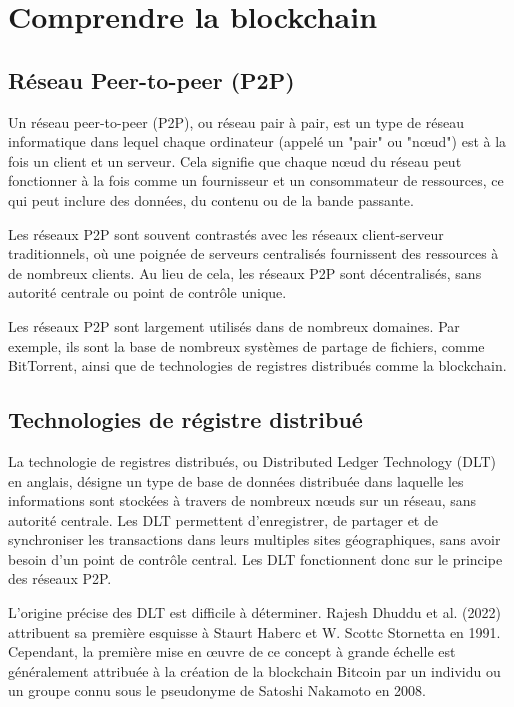 \chapter{Comprendre la blockchain} \label{annexe:comprendre la blockchain}
\section{Réseau Peer-to-peer (P2P)} \label{ansec:p2p}


Un réseau peer-to-peer (P2P), ou réseau pair à pair, est un type de réseau informatique dans lequel chaque ordinateur (appelé un "pair" ou "nœud") est à la fois un client et un serveur. Cela signifie que chaque nœud du réseau peut fonctionner à la fois comme un fournisseur et un consommateur de ressources, ce qui peut inclure des données, du contenu ou de la bande passante.

Les réseaux P2P sont souvent contrastés avec les réseaux client-serveur traditionnels, où une poignée de serveurs centralisés fournissent des ressources à de nombreux clients. Au lieu de cela, les réseaux P2P sont décentralisés, sans autorité centrale ou point de contrôle unique.

Les réseaux P2P sont largement utilisés dans de nombreux domaines. Par exemple, ils sont la base de nombreux systèmes de partage de fichiers, comme BitTorrent, ainsi que de technologies de registres distribués comme la blockchain.


\section{Technologies de régistre distribué} \label{ansec:dlt}


La technologie de registres distribués, ou Distributed Ledger Technology (DLT) en anglais, désigne un type de base de données distribuée dans laquelle les informations sont stockées à travers de nombreux nœuds sur un réseau, sans autorité centrale. Les DLT permettent d'enregistrer, de partager et de synchroniser les transactions dans leurs multiples sites géographiques, sans avoir besoin d'un point de contrôle central. Les DLT fonctionnent donc sur le principe des réseaux P2P.

L'origine précise des DLT est difficile à déterminer. Rajesh Dhuddu et al. (2022) attribuent sa première esquisse à Staurt Haberc et W. Scottc Stornetta en 1991. Cependant, la première mise en œuvre de ce concept à grande échelle est généralement attribuée à la création de la blockchain Bitcoin par un individu ou un groupe connu sous le pseudonyme de Satoshi Nakamoto en 2008.

